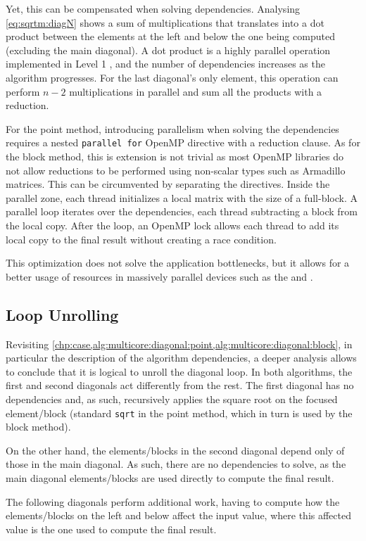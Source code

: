 \documentclass[../thesis]{subfiles}
\begin{document}
	Yet, this can be compensated when solving dependencies. Analysing \cref{eq:sqrtm:diagN} shows a sum of multiplications that translates into a dot product between the elements at the left and below the one being computed (excluding the main diagonal). A dot product is a highly parallel operation implemented in Level 1 \blas, and the number of dependencies increases as the algorithm progresses. For the last diagonal's only element, this operation can perform $n-2$ multiplications in parallel and sum all the products with a reduction.

	For the point method, introducing parallelism when solving the dependencies requires a nested \texttt{parallel for} OpenMP directive with a reduction clause. As for the block method, this is extension is not trivial as most OpenMP libraries do not allow reductions to be performed using non-scalar types such as Armadillo matrices. This can be circumvented by separating the directives. Inside the parallel zone, each thread initializes a local matrix with the size of a full-block. A parallel loop iterates over the dependencies, each thread subtracting a block from the local copy. After the loop, an OpenMP lock allows each thread to add its local copy to the final result without creating a race condition.

	This optimization does not solve the application bottlenecks, but it allows for a better usage of resources in massively parallel devices such as the \intel\xeonphi and \gpus.

	\subsection{Loop Unrolling}
	Revisiting \cref{chp:case,alg:multicore:diagonal:point,alg:multicore:diagonal:block}, in particular the description of the algorithm dependencies, a deeper analysis allows to conclude that it is logical to unroll the diagonal loop. In both algorithms, the first and second diagonals act differently from the rest. The first diagonal has no dependencies and, as such, recursively applies the square root on the focused element/block (standard \texttt{sqrt} in the point method, which in turn is used by the block method).

	On the other hand, the elements/blocks in the second diagonal depend only of those in the main diagonal. As such, there are no dependencies to solve, as the main diagonal elements/blocks are used directly to compute the final result.

	The following diagonals perform additional work, having to compute how the elements/blocks on the left and below affect the input value, where this affected value is the one used to compute the final result.
\end{document}
